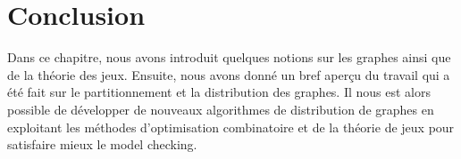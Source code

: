 






\section{Conclusion}{
Dans ce chapitre, nous avons introduit quelques notions sur les graphes ainsi que de la théorie des jeux. Ensuite, nous avons donné un bref aperçu du travail qui a été fait sur le partitionnement et la distribution des graphes. Il nous est alors possible de développer de nouveaux algorithmes de distribution de graphes en exploitant les méthodes  d'optimisation combinatoire et de la théorie de jeux pour satisfaire mieux le model checking.
}